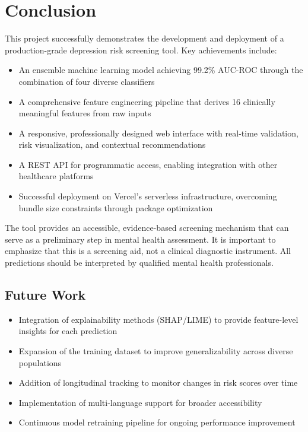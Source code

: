 \documentclass[11pt,a4paper]{article}
\begin{document}
\section{Conclusion}
\label{sec:conclusion}

This project successfully demonstrates the development and deployment of a production-grade depression risk screening tool. Key achievements include:

\begin{itemize}[leftmargin=*,nosep]
    \item An ensemble machine learning model achieving 99.2\% AUC-ROC through the combination of four diverse classifiers
    \item A comprehensive feature engineering pipeline that derives 16 clinically meaningful features from raw inputs
    \item A responsive, professionally designed web interface with real-time validation, risk visualization, and contextual recommendations
    \item A REST API for programmatic access, enabling integration with other healthcare platforms
    \item Successful deployment on Vercel's serverless infrastructure, overcoming bundle size constraints through package optimization
\end{itemize}

The tool provides an accessible, evidence-based screening mechanism that can serve as a preliminary step in mental health assessment. It is important to emphasize that this is a screening aid, not a clinical diagnostic instrument. All predictions should be interpreted by qualified mental health professionals.

\nopagebreak
\subsection{Future Work}

\begin{itemize}[leftmargin=*,nosep]
    \item Integration of explainability methods (SHAP/LIME) to provide feature-level insights for each prediction
    \item Expansion of the training dataset to improve generalizability across diverse populations
    \item Addition of longitudinal tracking to monitor changes in risk scores over time
    \item Implementation of multi-language support for broader accessibility
    \item Continuous model retraining pipeline for ongoing performance improvement
\end{itemize}
\end{document}
